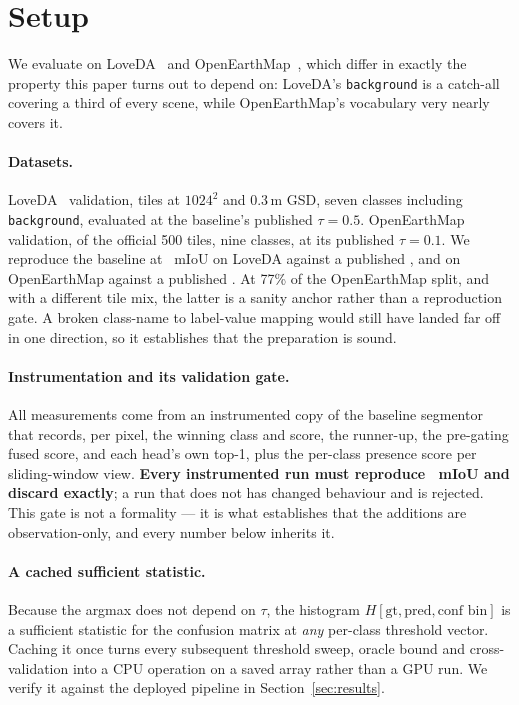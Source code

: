 \documentclass[10pt,a4paper]{article}                        %
\newcommand{\best}[1]{\textbf{#1}}
\newcommand{\bg}{\texttt{background}}
\begin{document}
\section{Setup}
\label{sec:setup}

We evaluate on LoveDA~\cite{loveda} and OpenEarthMap~\cite{openearthmap}, which
differ in exactly the property this paper turns out to depend on: LoveDA's
\bg{} is a catch-all covering a third of every scene, while OpenEarthMap's
vocabulary very nearly covers it.

\paragraph{Datasets.} LoveDA~\cite{loveda} validation, \loveTiles{} tiles at
$1024^2$ and 0.3\,m GSD, seven classes including \bg{}, evaluated at
the baseline's published $\tau=0.5$. OpenEarthMap~\cite{openearthmap} validation,
\oemTiles{} of the official 500 tiles, nine classes, at its published $\tau=0.1$.
We reproduce the baseline at \loveBase{}~mIoU on LoveDA against a published
\lovePub{}, and \oemBase{} on OpenEarthMap against a published \oemPub{}. At 77\% of the OpenEarthMap split, and with a
different tile mix, the latter is a sanity anchor rather than a reproduction
gate. A broken class-name to label-value mapping would still have landed far off
in one direction, so it establishes that the preparation is sound.

\paragraph{Instrumentation and its validation gate.} All measurements come from
an instrumented copy of the baseline segmentor that records, per pixel, the
winning class and score, the runner-up, the pre-gating fused score, and each
head's own top-1, plus the per-class presence score per sliding-window view.
\best{Every instrumented run must reproduce \loveInstr{}~mIoU and \discardPct{}
discard exactly}; a run that does not has changed behaviour and is rejected. This
gate is not a formality --- it is what establishes that the additions are
observation-only, and every number below inherits it.

\paragraph{A cached sufficient statistic.} Because the argmax does not depend on
$\tau$, the histogram $H[\text{gt},\text{pred},\text{conf bin}]$ is a sufficient
statistic for the confusion matrix at \emph{any} per-class threshold vector.
Caching it once turns every subsequent threshold sweep, oracle bound and
cross-validation into a CPU operation on a saved array rather than a GPU run. We
verify it against the deployed pipeline in Section~\ref{sec:results}.
\end{document}
